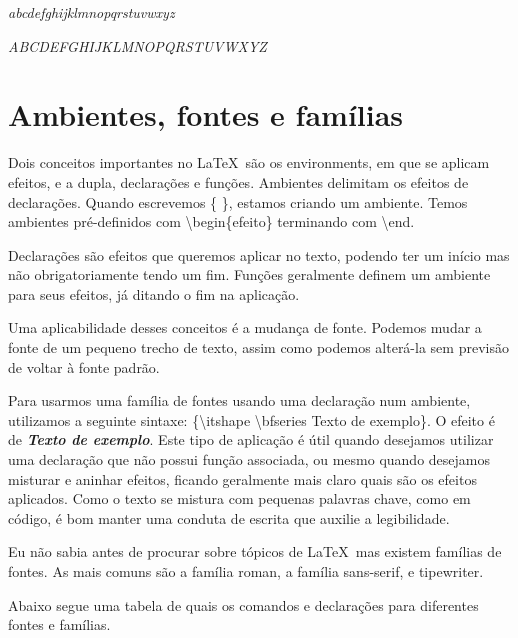 \textsl{abcdefghijklmnopqrstuvwxyz}

\textsl{ABCDEFGHIJKLMNOPQRSTUVWXYZ}


\section{Ambientes, fontes e famílias}
Dois conceitos importantes no \LaTeX\ são os environments,
em que se aplicam efeitos, e a dupla, declarações e funções.
Ambientes delimitam os efeitos de declarações.
Quando escrevemos \{ \}, estamos criando um ambiente.
Temos ambientes pré-definidos com \textbackslash begin\{efeito\} terminando com \textbackslash end.

Declarações são efeitos que queremos aplicar no texto, podendo ter um início mas não obrigatoriamente tendo um fim.
Funções geralmente definem um ambiente para seus efeitos, já ditando o fim na aplicação.

Uma aplicabilidade desses conceitos é a mudança de fonte.
Podemos mudar a fonte de um pequeno trecho de texto, assim como podemos alterá-la sem previsão de voltar à fonte padrão.

Para usarmos uma família de fontes usando uma declaração num ambiente, utilizamos a seguinte sintaxe:
\{\textbackslash itshape \textbackslash bfseries Texto de exemplo\}.
O efeito é de {\itshape \bfseries Texto de exemplo}.
Este tipo de aplicação é útil quando desejamos utilizar uma declaração que não possui função associada,
ou mesmo quando desejamos misturar e aninhar efeitos, ficando geralmente mais claro quais são os efeitos aplicados.
Como o texto se mistura com pequenas palavras chave, como em código, é bom manter uma conduta de escrita que auxilie a legibilidade.

Eu não sabia antes de procurar sobre tópicos de \LaTeX\, mas existem famílias de fontes.
As mais comuns são a família roman, a família sans-serif, e tipewriter.

Abaixo segue uma tabela de quais os comandos e declarações para diferentes fontes e famílias.

